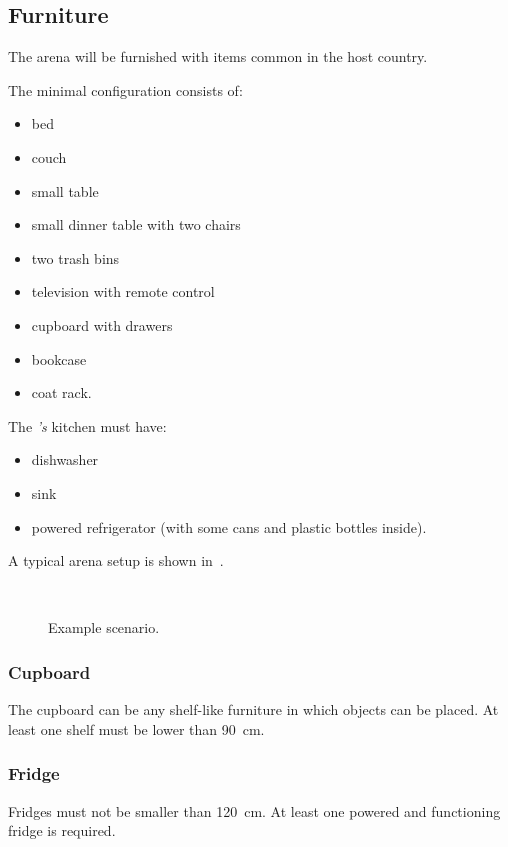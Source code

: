\subsection{Furniture}
\label{sec:rules:scenario:furniture}
The arena will be furnished with items common in the host country.

The minimal configuration consists of:
\begin{itemize}
	\item bed
	\item couch
	\item small table
	\item small dinner table with two chairs
	\item two trash bins
	\item television with remote control
	\item cupboard with drawers
	\item bookcase
	\item coat rack.
\end{itemize}

The \Arena\textit{'s} kitchen must have:
\begin{itemize}
	\item dishwasher
	\item sink
	\item powered refrigerator (with some cans and plastic bottles inside).
\end{itemize}

A typical arena setup is shown in~.

\begin{figure}[H]
	\centering
	 ~
	\caption{Example \RoboCup\AtHome{} scenario.}
	\label{fig:arena}
\end{figure}

\subsubsection{Cupboard}
The cupboard can be any shelf-like furniture in which objects can be placed. At least one shelf must be lower than \SI{90}{\cm}.

\subsubsection{Fridge}
Fridges must not be smaller than \SI{120}{\cm}. At least one powered and functioning fridge is required.

